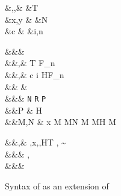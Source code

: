\documentclass[manuscript,screen,nonacm]{acmart}
\begin{document}
 \begin{figure}[h]
 \begin{syntax}
  &\TyVar,\beta,\Co &\qquad{} &T \\
  &x,y &\qquad{} &N \\
  &c &\qquad{} &i,n \in {} \\
 \end{syntax}
 \begin{syntax}
  &&\kappa \bnfeq& \star \bnfor \kappa \to \kappa \bnfor \shl{\sigma \sim \tau}\\
  &&\tau,\sigma \bnfeq& \TyVar \bnfor T \bnfor \tau \to \tau \bnfor \tau\App\tau \bnfor \Forall {\TyVar\co\kappa} \tau \bnfor F_n\\
  &&\nu,\Co \bnfeq& c \bnfor {}\tau \bnfor \Sym\Co \bnfor \trans\nu\Co %
 \bnfor \Forall {\TyVar\co\kappa} \Co \bnfor \Co\At\tau %
 \bnfor \nu\App\Co \bnfor \Left \Co \bnfor \Right \Co \bnfor \Nth i \Co \bnfor H\App\many\Co \bnfor F_n\many\Co \bnfor \SubCo \Co
 \\  %
  && \phi \bnfeq& \tau \bnfor \Co\\
  &&\rho \bnfeq& \texttt{N} \bnfor \texttt{R} \bnfor \texttt{P}\\
  &&P \bnfeq& H\App \many{\TyVar\co\kappa} \\
  &&M,N \bnfeq& x \bnfor {} M \bnfor M\App N \bnfor \TLam{\tau\co\kappa} M \bnfor M\App \tau \bnfor H \bnfor \Case M  \bnfor \Cast \Tm \Co
 \end{syntax}
 \begin{syntax}
  &&\TEnv,\Delta \bnfeq& \empt \bnfor \TEnv,x\co\tau \bnfor \TEnv,\TyVar\co\kappa \bnfor \TEnv,H\co T \bnfor \TEnv, \Co \co \tau\sim\sigma\\
  &&\REnv \bnfeq& \empt \bnfor \REnv, \TyVar\co\rho\\
  &&\Subst \bnfeq& \empt \bnfor \Set{\many{\TyVar \mapsto \tau}}
 \end{syntax}

 \caption{Syntax of \SFR as an extension of \SFC}
 \label{fig:sfr-syntax}
 \end{figure}
\end{document}

